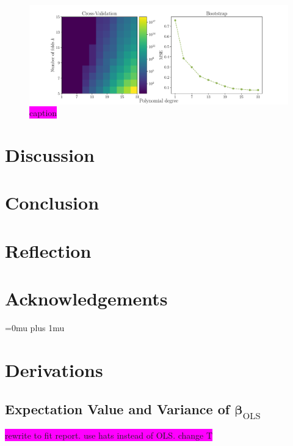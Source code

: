 \documentclass[aps,pra,english,notitlepage,reprint,nofootinbib]{revtex4-1}  %
\begin{document}
\begin{figure}
  \vspace*{-5pt}
  \centering %
  \includegraphics[width=\textwidth]{../figs/g_kfold_vs_bootstrap.pdf}
  \caption{\colorbox{magenta}{caption}}\label{fig:g kfold vs bootstrap}
  \vspace*{-5pt}
\end{figure}


\section{Discussion}\label{sec:discussion}


\section{Conclusion}\label{sec:conclusion}


\section{Reflection}\label{sec:reflection}

\section*{Acknowledgements}\label{sec:cknowledgements}

\Urlmuskip=0mu plus 1mu\relax
\onecolumngrid


\newpage
\appendix
\section{Derivations}\label{appsec:derivations}
\subsection{Expectation Value and Variance of \texorpdfstring{$\boldsymbol{\beta}_\text{OLS}$}{Lg}}\label{subapp:beta OLS}
\colorbox{magenta}{rewrite to fit report. use hats instead of OLS. change T}
\end{document}
